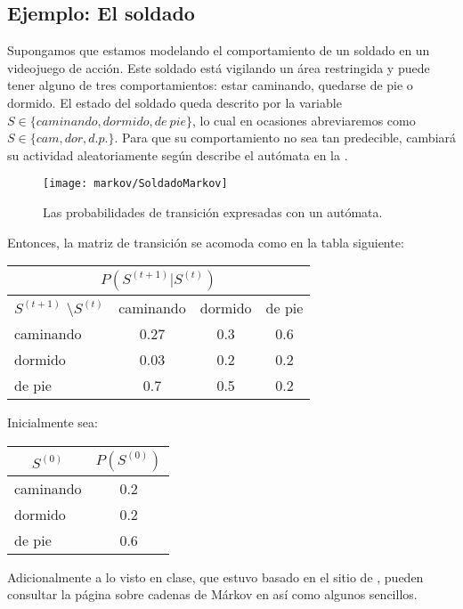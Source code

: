 \subsection{Ejemplo: El soldado}

Supongamos que estamos modelando el comportamiento de un soldado en un videojuego de acción.  Este soldado está vigilando un área restringida y puede tener alguno de tres comportamientos: estar caminando, quedarse de pie o dormido.  El estado del soldado queda descrito por la variable $S \in \{caminando, dormido, de\ pie\}$, lo cual en ocasiones abreviaremos como $S \in \{cam, dor, d.p.\}$.  Para que su comportamiento no sea tan predecible, cambiará su actividad aleatoriamente según describe el autómata en la .

\begin{figure}
 \centering
 \texttt{[image: markov/SoldadoMarkov]}
 \caption{Las probabilidades de transición expresadas con un autómata.}\label{Fig:SoldadoMarkov}
\end{figure}

Entonces, la matriz de transición se acomoda como en la tabla siguiente:

 \begin{center}
 \begin{tabular}{l|ccc}
  \multicolumn{4}{c}{$P(S^{(t+1)}|S^{(t)})$} \\ \hline
  $S^{(t+1)}$ \textbackslash $S^{(t)}$          & caminando & dormido & de pie \\ \hline
  caminando &    0.27   &    0.3  & 0.6 \\
  dormido   &    0.03   &    0.2  & 0.2 \\
  de pie    &    0.7    &    0.5  & 0.2
 \end{tabular}
 \end{center}

 Inicialmente sea:

 \begin{center}
 \begin{tabular}{l|c}
  \multicolumn{1}{c|}{$S^{(0)}$}   &  $P(S^{(0)})$ \\ \hline
  caminando &    0.2 \\
  dormido   &    0.2 \\
  de pie    &    0.6
 \end{tabular}
 \end{center}



Adicionalmente a lo visto en clase, que estuvo basado en el sitio de , pueden consultar la página sobre cadenas de Márkov en  así como algunos  sencillos.


